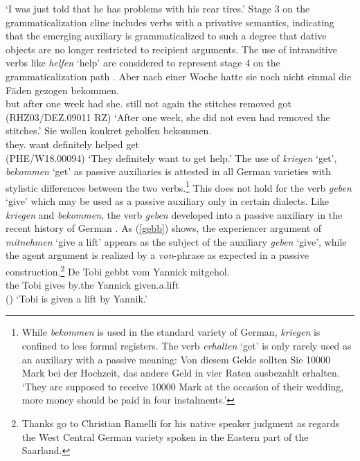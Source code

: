\documentclass[output=paper
	        ,collection
	        ,collectionchapter
 	        ,biblatex
                ,babelshorthands
                ,newtxmath
                ,draftmode
                ,colorlinks, citecolor=brown
]{./langsci/langscibook}
\begin{document}
\glt `I was just told that he has problems with his rear tires.'
\z
Stage 3 on the grammaticalization cline includes verbs with a privative semantics, indicating that the emerging auxiliary is grammaticalized to such a degree that dative objects are no longer restricted to recipient arguments. The use of intransitive verbs like \textit{helfen} `help' are considered to represent stage 4 on the grammaticalization path \citep[64]{ebert78}.
\eal \label{intrans}
\ex
\gll Aber nach einer Woche hatte sie noch nicht einmal die Fäden gezogen bekommen.  \\ but after one week had she.\nom {} still not again the stitches removed got \\ \hfill (RHZ03/DEZ.09011 RZ)
\glt `After one week, she did not even had removed the stitches.'
\ex
\gll  Sie wollen konkret geholfen bekommen.  \\ they.\nom {} want definitely helped get  \\ \hfill  (PHE/W18.00094)
\glt `They definitely want to get help.'
\zl
The use of \textit{kriegen} `get', \textit{bekommen} `get' as passive auxiliaries is attested in all German varieties with stylistic differences between the two verbs.\footnote{While \textit{bekommen} is used in the standard variety of German, \textit{kriegen} is confined to less formal registers. The verb \textit{erhalten} `get' is only rarely used as an auxiliary with a passive meaning:
\vspace{-0.2cm}
\ea Von diesem Gelde sollten Sie 10000 Mark bei der Hochzeit, das andere Geld in vier Raten ausbezahlt erhalten.
\glt `They are supposed to receive 10000 Mark at the occasion of their wedding, more money should be paid in four instalments.'
\z
\vspace{-0.2cm}
} 
This does not hold for the verb \textit{geben} `give' which may be used as a passive auxiliary only in certain dialects. Like \textit{kriegen} and \textit{bekommen}, the verb \textit{geben} developed into a passive auxiliary in the recent history of German \citep{lenz2007}. As (\ref{gebb}) shows, the experiencer argument of \textit{mitnehmen} `give a lift' appears as the subject of the auxiliary \textit{geben} `give', while the agent argument is realized by a \textit{von}-phrase as expected in a passive construction.\footnote{Thanks go to Christian Ramelli for his native speaker judgment as regards the West Central German variety spoken in the Eastern part of the Saarland.}
\ea \label{gebb}
\gll De Tobi gebbt vom Yannick mitgehol. \\
the Tobi gives by.the Yannick given.a.lift   \\ \hfill ()
\glt `Tobi is given a lift by Yannik.'
\z
\end{document}
